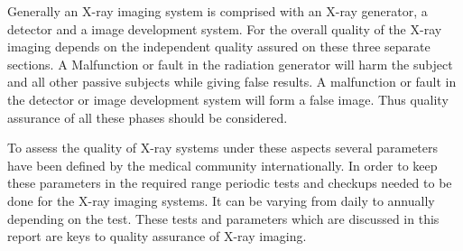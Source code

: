 \documentclass[12pt]{article}
\begin{document}
Generally an X-ray imaging system is comprised with an X-ray generator, a detector and a image development system. For the overall quality of the X-ray imaging depends on the independent quality assured on these three separate sections. A Malfunction or fault in the radiation generator will harm the subject and all other passive subjects while giving false results. A malfunction or fault in the detector or image development system will form a false image. Thus quality assurance of all these phases should be considered. 

To assess the quality of X-ray systems under these aspects several parameters have been defined by the medical community internationally. In order to keep these parameters in the required range periodic tests and checkups needed to be done for the X-ray imaging systems. It can be varying from daily to annually depending on the test. These tests and parameters which are discussed in this report are keys to quality assurance of X-ray imaging.
\newline
\newline
\pagebreak
\end{document}
